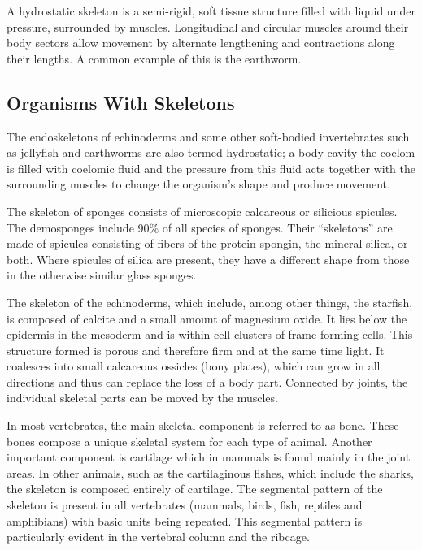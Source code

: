 A hydrostatic skeleton is a semi-rigid, soft tissue structure filled with liquid under pressure, surrounded by muscles. Longitudinal and circular muscles around their body sectors allow movement by alternate lengthening and contractions along their lengths. A common example of this is the earthworm.

\hypertarget{organisms-with-skeletons}{%
\subsection{Organisms With Skeletons}\label{organisms-with-skeletons}}

The endoskeletons of echinoderms and some other soft-bodied invertebrates such as jellyfish and earthworms are also termed hydrostatic; a body cavity the coelom is filled with coelomic fluid and the pressure from this fluid acts together with the surrounding muscles to change the organism's shape and produce movement.

The skeleton of sponges consists of microscopic calcareous or silicious spicules. The demosponges include 90\% of all species of sponges. Their ``skeletons'' are made of spicules consisting of fibers of the protein spongin, the mineral silica, or both. Where spicules of silica are present, they have a different shape from those in the otherwise similar glass sponges.

The skeleton of the echinoderms, which include, among other things, the starfish, is composed of calcite and a small amount of magnesium oxide. It lies below the epidermis in the mesoderm and is within cell clusters of frame-forming cells. This structure formed is porous and therefore firm and at the same time light. It coalesces into small calcareous ossicles (bony plates), which can grow in all directions and thus can replace the loss of a body part. Connected by joints, the individual skeletal parts can be moved by the muscles.

In most vertebrates, the main skeletal component is referred to as bone. These bones compose a unique skeletal system for each type of animal. Another important component is cartilage which in mammals is found mainly in the joint areas. In other animals, such as the cartilaginous fishes, which include the sharks, the skeleton is composed entirely of cartilage. The segmental pattern of the skeleton is present in all vertebrates (mammals, birds, fish, reptiles and amphibians) with basic units being repeated. This segmental pattern is particularly evident in the vertebral column and the ribcage.

